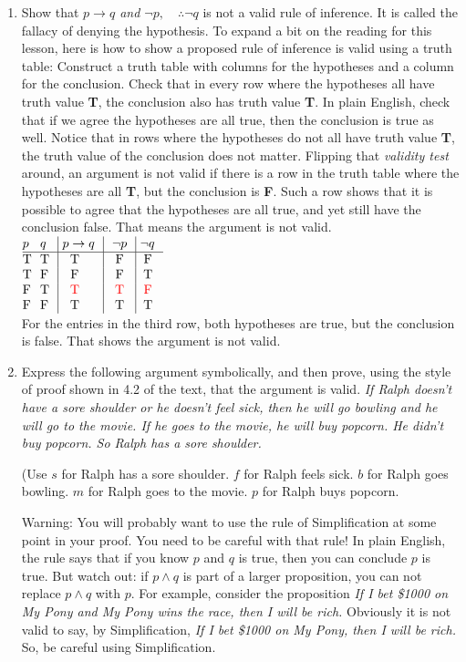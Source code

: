 \documentclass[11pt]{amsart}
\begin{document}
\begin{enumerate}
\begin{enumerate}
\end{enumerate}
\vfill\break
\item  Show that {\it $p\longrightarrow q$ and $\neg p,\quad \therefore \neg q$} is not a valid rule
of inference. It is called the fallacy of denying the hypothesis. To expand a bit on the reading for this lesson, here is how to show a proposed rule of inference is valid using a truth table: Construct a truth table with columns for the hypotheses and a column for the conclusion. Check that in every row where the hypotheses all have truth value {\bf T}, the conclusion also has truth value {\bf T}. In plain English, check that if we agree the hypotheses are all true, then the conclusion is true as well. Notice that in rows where the hypotheses do not all have truth value {\bf T}, the truth value of the conclusion does not matter. Flipping that {\it validity test}  around, an argument is not valid if there is a row in the truth table where the hypotheses are all {\bf T}, but the conclusion is {\bf F}. Such a row shows that it is possible to agree that the hypotheses are all true, and yet still have the conclusion false. That means the argument is not valid.\\[5pt]

{\color{blue}
$\vbox{\offinterlineskip
\halign { \strut # & # & \vrule ~# & \vrule  ~~# & \vrule ~# & \vrule  ~# \cr
$p$ & $q$ &  $p \rightarrow q$ &  $\lnot p$ & $\lnot q$ \cr
\noalign{\hrule}
T   &  T   &   T  &  F  & \,F \cr
T   &  F    & F  &  F  & \,T \cr
F   &  T    & {\color{red}T}  & {\color{red} T}  & \,{\color{red}F} \cr
F   &  F    & T  &  T  & \,T \cr
}}$\\[3pt]
For the entries in the third row, both hypotheses are true, but the conclusion is false. That shows the argument 
is not valid.\\[5pt]
}
\vfill\break
\item Express the following argument symbolically, and then prove, using the style of proof shown in  4.2 of the text,  that the argument is valid.  {\it If Ralph doesn't have a sore shoulder
or he doesn't feel sick, then he will go bowling and  he will go to the movie. If he goes to the movie, he will buy popcorn.  He didn't buy popcorn. So Ralph has a sore shoulder.}

(Use
$s$ for Ralph has a sore shoulder.
$f$ for Ralph feels sick. 
$b$ for Ralph goes bowling.
$m$ for Ralph goes to the movie.
$p$ for Ralph buys popcorn.

Warning: You will probably want to use the rule of Simplification at some point in your proof. You need to be careful with that rule! In plain English, the rule says that if you know $p$ and $q$ is true, then you can conclude $p$ is true. But watch out: if $p \land q$ is part of a larger proposition, you can not replace $p \land q$ with $p$. For example, consider the proposition {\it If I bet \$1000 on My Pony and My Pony wins the race, then I will be rich.} Obviously it is not valid to say, by Simplification, {\it If I bet \$1000 on My Pony, then I will be rich.} So, be careful using Simplification.\\[5pt]


\end{enumerate}
\end{document}
